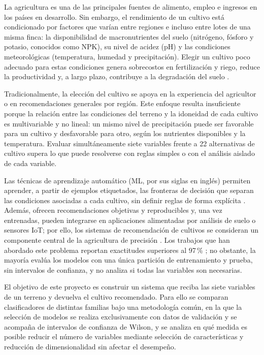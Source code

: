 \documentclass[conference]{IEEEtran}
\begin{document}
La agricultura es una de las principales fuentes de alimento, empleo e ingresos en los países en desarrollo. Sin embargo, el rendimiento de un cultivo está condicionado por factores que varían entre regiones e incluso entre lotes de una misma finca: la disponibilidad de macronutrientes del suelo (nitrógeno, fósforo y potasio, conocidos como NPK), su nivel de acidez (pH) y las condiciones meteorológicas (temperatura, humedad y precipitación). Elegir un cultivo poco adecuado para estas condiciones genera sobrecostos en fertilización y riego, reduce la productividad y, a largo plazo, contribuye a la degradación del suelo \cite{thilakarathne2022}.

Tradicionalmente, la elección del cultivo se apoya en la experiencia del agricultor o en recomendaciones generales por región. Este enfoque resulta insuficiente porque la relación entre las condiciones del terreno y la idoneidad de cada cultivo es multivariable y no lineal: un mismo nivel de precipitación puede ser favorable para un cultivo y desfavorable para otro, según los nutrientes disponibles y la temperatura. Evaluar simultáneamente siete variables frente a 22 alternativas de cultivo supera lo que puede resolverse con reglas simples o con el análisis aislado de cada variable.

Las técnicas de aprendizaje automático (ML, por sus siglas en inglés) permiten aprender, a partir de ejemplos etiquetados, las fronteras de decisión que separan las condiciones asociadas a cada cultivo, sin definir reglas de forma explícita \cite{bishop2006}. Además, ofrecen recomendaciones objetivas y reproducibles y, una vez entrenadas, pueden integrarse en aplicaciones alimentadas por análisis de suelo o sensores IoT; por ello, los sistemas de recomendación de cultivos se consideran un componente central de la agricultura de precisión \cite{thilakarathne2022,shastri2025}. Los trabajos que han abordado este problema reportan exactitudes superiores al 97\,\% \cite{thilakarathne2022,prity2024,alam2025}; no obstante, la mayoría evalúa los modelos con una única partición de entrenamiento y prueba, sin intervalos de confianza, y no analiza si todas las variables son necesarias.

El objetivo de este proyecto es construir un sistema que reciba las siete variables de un terreno y devuelva el cultivo recomendado. Para ello se comparan clasificadores de distintas familias bajo una metodología común, en la que la selección de modelos se realiza exclusivamente con datos de validación y se acompaña de intervalos de confianza de Wilson, y se analiza en qué medida es posible reducir el número de variables mediante selección de características y reducción de dimensionalidad sin afectar el desempeño.
\end{document}
